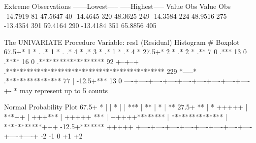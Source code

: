 \documentclass{article}
\begin{document}
\begin{Woutput}
           Extreme Observations
------Lowest-----        -----Highest-----
   Value      Obs           Value      Obs
-14.7919       81         47.5647       40
-14.4645      320         48.3625      249
-14.3584      224         48.9516      275
-13.4354      391         59.4164      290
-13.4184      351         65.8856      405

The UNIVARIATE Procedure
Variable:  res1  (Residual)
                         Histogram                         #  Boxplot
   67.5+*                                                  1     *
       .
       .*                                                  1     *
       .
       .*                                                  4     *
       .*                                                  3     *
       .*                                                  1     *
       .*                                                  4     *
   27.5+*                                                  2     *
       .*                                                  2     *
       .**                                                 7     0
       .***                                               13     0
       .****                                              16     0
       .*******************                               92  +--+--+
       .**********************************************   229  *-----*
       .****************                                  77     |
  -12.5+***                                               13     0
        ----+----+----+----+----+----+----+----+----+-
        * may represent up to 5 counts

                       Normal Probability Plot
    67.5+                                                  *
        |
        |                                                  *
        |
        |                                                ***
        |                                              **
        |                                             *
        |                                            **
    27.5+                                           **
        |                                           *  +++++
        |                                         ***++
        |                                    +++***
        |                               +++++ ***
        |                         +++++********
        |                ***************
        |      ***********+++
   -12.5+*******   +++++
         +----+----+----+----+----+----+----+----+----+----+
             -2        -1         0        +1        +2


\end{Woutput}
\end{document}
